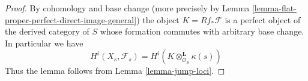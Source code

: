 \documentclass{stacks-project}
\theoremstyle{plain}
\theoremstyle{definition}
\theoremstyle{remark}
\numberwithin{equation}{subsection}
\begin{document}
\begin{proof}
By cohomology and base change (more precisely by
Lemma \ref{lemma-flat-proper-perfect-direct-image-general})
the object $K = Rf_*\mathcal{F}$ is a perfect object of the derived
category of $S$ whose formation commutes with arbitrary base change.
In particular we have
$$
H^i(X_s, \mathcal{F}_s) = H^i(K \otimes_{\mathcal{O}_S}^\mathbf{L} \kappa(s))
$$
Thus the lemma follows from
Lemma \ref{lemma-jump-loci}.
\end{proof}
\end{document}
